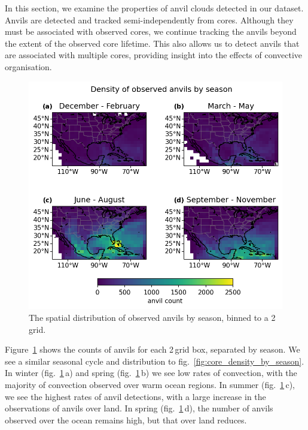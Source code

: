 In this section, we examine the properties of anvil clouds detected in our dataset.
Anvils are detected and tracked semi-independently from cores.
Although they must be associated with observed cores, we continue tracking the anvils beyond the extent of the observed core lifetime.
This also allows us to detect anvils that are associated with multiple cores, providing insight into the effects of convective organisation.

\begin{figure}[tp]
    \centering
    \includegraphics[width=\textwidth]{figures/ch2_12.png}
    \caption[
    The spatial distribution of observed anvils by season
    ]{
    The spatial distribution of observed anvils by season, binned to a 2\,\textdegree grid.
    }
    \label{fig:anvil_distribution_map}
\end{figure}

Figure~\ref{fig:anvil_distribution_map} shows the counts of anvils for each 2\,\textdegree grid box, separated by season.
We see a similar seasonal cycle and distribution to fig.~\ref{fig:core_density_by_season}.
In winter (fig.~\ref{fig:anvil_distribution_map}\,a) and spring (fig.~\ref{fig:anvil_distribution_map}\,b) we see low rates of convection, with the majority of convection observed over warm ocean regions.
In summer (fig.~\ref{fig:anvil_distribution_map}\,c), we see the highest rates of anvil detections, with a large increase in the observations of anvils over land.
In spring (fig.~\ref{fig:anvil_distribution_map}\,d), the number of anvils observed over the ocean remains high, but that over land reduces.

